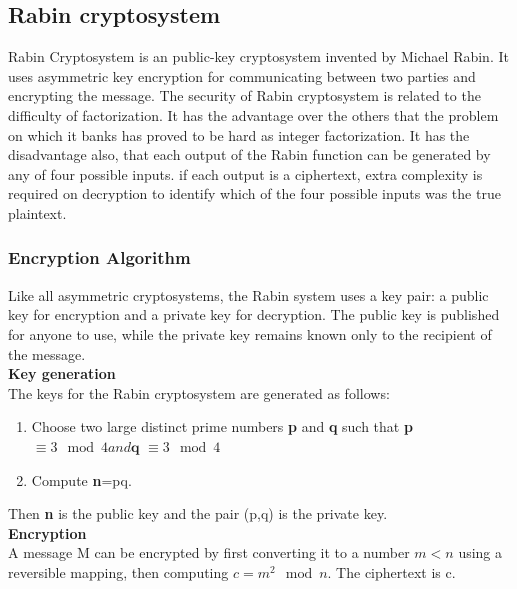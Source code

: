 \documentclass{article}
\begin{document}
\subsection{Rabin cryptosystem}
Rabin Cryptosystem is an public-key cryptosystem invented by Michael Rabin. It uses asymmetric key encryption for communicating between two parties and encrypting the message. The security of Rabin cryptosystem is related to the difficulty of factorization. It has the advantage over the others that the problem on which it banks has proved to be hard as integer factorization. It has the disadvantage also, that each output of the Rabin function can be generated by any of four possible inputs. if each output is a ciphertext, extra complexity is required on decryption to identify which of the four possible inputs was the true plaintext.
\subsubsection{Encryption Algorithm}
Like all asymmetric cryptosystems, the Rabin system uses a key pair: a public key for encryption and a private key for decryption. The public key is published for anyone to use, while the private key remains known only to the recipient of the message.\\

\textbf{Key generation}\\
The keys for the Rabin cryptosystem are generated as follows:
\begin{enumerate}
\item Choose two large distinct prime numbers \textbf{p} and \textbf{q} such that \textbf{p }$ \equiv 3 \mod 4  and \textbf{q } \equiv 3\mod 4$
\item Compute \textbf{n}=pq.
\end{enumerate}
Then \textbf{n} is the public key and the pair (p,q) is the private key.\\

\textbf{Encryption}\\
A message M can be encrypted by first converting it to a number $m<n$ using a reversible mapping, then computing $c = m^2 \mod n$. The ciphertext is c.\\
\end{document}
